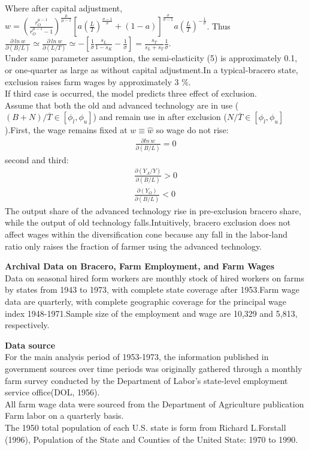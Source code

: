 \documentclass[../root]{subfiles}
\begin{document}
    Where after capital adjustment,  $w =\left(\frac{r_O^{\mu-1}}{r_O^{\mu-1}-1}\right)^{\frac{\mu}{\mu-1}} \left[a(\frac{L}{T})^{\frac{\sigma-1}{\sigma}} +(1-a)\right]^{\frac{\sigma}{\sigma-1}} a(\frac{L}{T})^{-\frac{1}{\sigma}}$.
    Thus $\frac{\partial \ ln \ w}{\partial (B/L)} \simeq \frac{\partial \ ln \  w}{\partial (L/T)} \simeq -\left[\frac{1}{\sigma}\frac{s_L}{1-s_K}- \frac{1}{\sigma} \right] = \frac{s_T}{s_L+s_T}\frac{1}{\sigma}$. \\
    Under same parameter assumption, the semi-elasticity (5) is approximately 0.1, or one-quarter as large as without capital adjustment.In a typical-bracero state, exclusion raises farm wages by approximately 3 \%. \\
    If third case is occurred, the model predicts three effect of exclusion.  \\
    Assume that both the old and advanced technology are in use ($(B+N) / \overline{T} \in [\phi_l, \phi_u] $) and remain use in after exclusion ($N/ \overline{T} \in [\phi_l, \phi_u]$).First, the wage remains fixed at $w \equiv \hat{w}$ so wage do not rise:
    \begin{align}
        \frac{\partial ln \ w}{\partial (B/L)} = 0
    \end{align}
    second and third:
    \begin{align}
        \frac{\partial (Y_A/Y)}{\partial (B/L)} >0  \nonumber\\
        \frac{\partial (Y_O)}{\partial (B/L)}<0
    \end{align}
    The output share of the advanced technology rise in pre-exclusion bracero share, while the output of old technology falls.Intuitively, bracero exclusion does not affect wages within the diversification cone because any fall in the labor-land ratio only raises the fraction of farmer using the advanced technology. 
    
    {\bf Archival Data on Bracero, Farm Employment, and Farm Wages} \\
    Data on seasonal hired form workers are monthly stock of hired workers on farms by states from 1943 to 1973, with complete state coverage after 1953.Farm wage data are quarterly, with complete geographic coverage for the principal wage index 1948-1971.Sample size of the employment and wage are 10,329 and  5,813, respectively. 
    
    {\bf Data source} \\
    For the main analysis period of 1953-1973, the information published in government sources over time periods was originally gathered through a monthly farm survey conducted by the Department of Labor's state-level employment service office(DOL, 1956). \\
    All farm wage data were sourced from the Department of Agriculture publication Farm labor on a quarterly basis.  \\
    The 1950 total population of each U.S. state is form from Richard L.Forstall (1996), Population of the State and Counties of the United State: 1970 to 1990.
    
\end{document}
